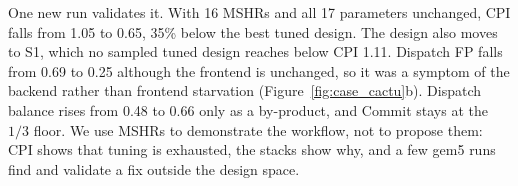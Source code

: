 One new run validates it.
%
With 16 MSHRs and all 17 parameters unchanged, CPI falls from 1.05 to 0.65, 35\% below the best tuned design.
%
The design also moves to S1, which no sampled tuned design reaches below CPI 1.11.
%
Dispatch FP falls from 0.69 to 0.25 although the frontend is unchanged, so it was a symptom of the backend rather than frontend starvation (Figure~\ref{fig:case_cactu}b).
%
Dispatch balance rises from 0.48 to 0.66 only as a by-product, and Commit stays at the $1/3$ floor.
%
We use MSHRs to demonstrate the workflow, not to propose them: CPI shows that tuning is exhausted, the stacks show why, and a few gem5 runs find and validate a fix outside the design space.
